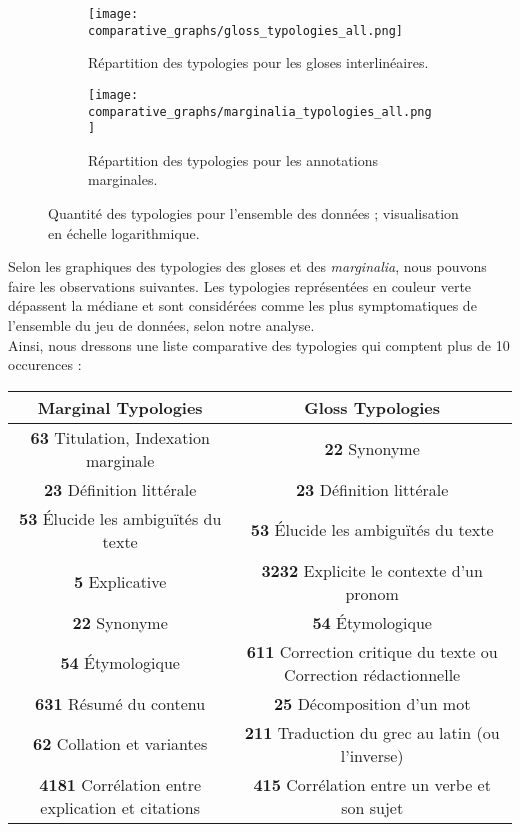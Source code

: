 \documentclass[a4paper, twoside, 12pt]{book}
\begin{document}
{\begin{figure}[H]
    \centering
    \begin{subfigure}[b]{\textwidth}
        \texttt{[image: comparative\_graphs/gloss\_typologies\_all.png]}
        \caption{Répartition des typologies pour les gloses interlinéaires.}
    \end{subfigure}
    \vfill
    \begin{subfigure}[b]{\textwidth}
        \texttt{[image: comparative\_graphs/marginalia\_typologies\_all.png]}
        \caption{Répartition des typologies pour les annotations marginales.}
    \end{subfigure}
    \caption{Quantité des typologies pour l'ensemble des données ; visualisation en échelle logarithmique.}
    \label{fig:entire-figure}
\end{figure}

Selon les graphiques des typologies des gloses et des \textit{marginalia}, nous pouvons faire les observations suivantes. Les typologies représentées en couleur verte dépassent la médiane et sont considérées comme les plus symptomatiques de l'ensemble du jeu de données, selon notre analyse. \\

Ainsi, nous dressons une liste comparative des typologies qui comptent plus de 10 occurences :



\begin{table}[H]
\centering
\begin{tabular}{|c|c|}
\hline
\rowcolor{gray!20}
\textbf{Marginal Typologies} & \textbf{Gloss Typologies} \\
\hline
{\textbf{63} Titulation, Indexation marginale} & {\textbf{22} Synonyme} \\
\hline
\textbf{23} Définition littérale & \textbf{23} Définition littérale \\
\hline
\textbf{53} Élucide les ambiguïtés du texte & \textbf{53} Élucide les ambiguïtés du texte \\
\hline
\textbf{5} Explicative &{\textbf{3232} Explicite le contexte d'un pronom} \\
\hline
{\textbf{22} Synonyme} &{\textbf{54} Étymologique} \\
\hline
{\textbf{54} Étymologique} & {\textbf{611} Correction critique du texte ou Correction rédactionnelle} \\
\hline
{\textbf{631} Résumé du contenu} & {\textbf{25} Décomposition d'un mot} \\
\hline
{\textbf{62} Collation et variantes} & {\textbf{211} Traduction du grec au latin (ou l'inverse)} \\
\hline
{\textbf{4181} Corrélation entre explication et citations} & {\textbf{415} Corrélation entre un verbe et son sujet} \\
\hline
\end{tabular}
\end{table}

}
\end{document}
